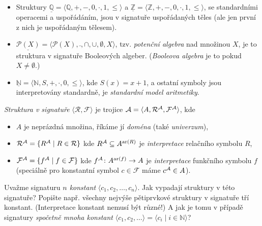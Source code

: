 \begin{example}
\begin{itemize}
\begin{itemize}
    \end{itemize}
    Všechny tyto struktury \emph{splňují axiomy teorie grup}, snadno ale najdeme jiné struktury, které tyto axiomy nesplňují, a nejsou tedy grupami. Například změníme-li ve struktuře $\mathbb Z_n$ interpretaci symbolu $+$ na funkci $\cdot$ (modulo $n$).
    \item Struktury $\underline{\mathbb Q}=\langle \mathbb Q, +, -, 0,\cdot,1,\leq\rangle$ a $\underline{\mathbb Z}=\langle \mathbb Z, +, -, 0,\cdot,1,\leq\rangle$, se standardními operacemi a uspořádáním, jsou v signatuře uspořádaných těles (ale jen první z nich je uspořádaným tělesem).
    \item $\underline{\mathcal P(X)}=\langle \mathcal P(X),\bar{},\cap,\cup,\emptyset,X\rangle$, tzv. \emph{potenční algebra} nad množinou $X$, je to struktura v signatuře Booleových algeber. (\emph{Booleova algebra} je to pokud $X\neq\emptyset$.)
    \item $\underline{\mathbb N}=\langle \mathbb N,S,+,\cdot,0,\leq\rangle$, kde $S(x)=x+1$, a ostatní symboly jsou interpretovány standardně, je \emph{standardní model aritmetiky}.
\end{itemize}
\end{example}


\begin{definition}[Struktura]
\emph{Struktura v signatuře} $\langle\mathcal R,\mathcal F\rangle$ je trojice $\mathcal{A}=\langle A, \mathcal R^{\mathcal{A}},\mathcal F^{\mathcal{A}} \rangle$, kde
\begin{itemize}
   \item  $A$ je neprázdná množina, říkáme jí \emph{doména} (také \emph{univerzum}),
   \item $\mathcal R^{\mathcal{A}}=\{R^{\mathcal{A}}\mid R\in\mathcal R\}$ kde $R^{\mathcal{A}}\subseteq A^{\mathrm{ar}(R)}$ je \emph{interpretace} relačního symbolu $R$,
   \item $\mathcal F^{\mathcal{A}}=\{f^{\mathcal{A}}\mid f\in\mathcal F\}$ kde $f^{\mathcal{A}}\colon A^{\mathrm{ar}(f)}\to A$ je \emph{interpretace} funkčního symbolu $f$ (speciálně pro konstantní symbol $c\in\mathcal F$ máme $c^{\mathcal{A}}\in A$).
\end{itemize}


\end{definition}


\begin{exercise}
Uvažme signaturu \emph{$n$ konstant} $\langle c_1,c_2,\dots,c_n\rangle$. Jak vypadají struktury v této signatuře? Popište např. všechny nejvýše pětiprvkové struktury v signatuře tří konstant. (Interpretace konstant nemusí být různé!)
A jak je tomu v případě signatury \emph{spočetně mnoha konstant} $\langle c_1,c_2,\dots\rangle=\langle c_i\mid i\in\mathbb N\rangle$?
\end{exercise}


